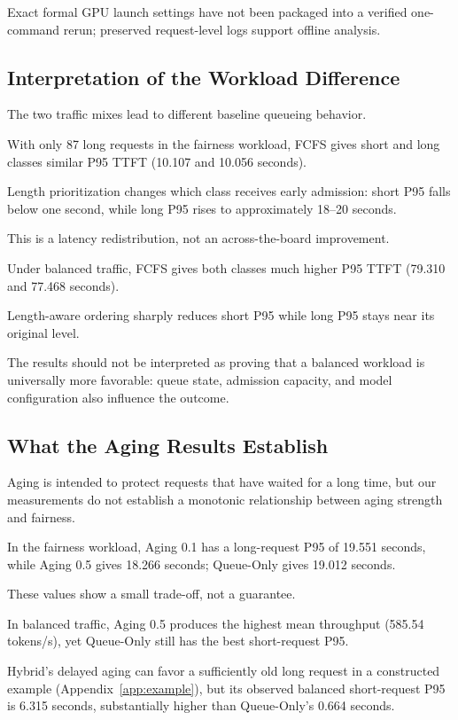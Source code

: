 \documentclass[sigplan,nonacm]{acmart}
\begin{document}
Exact formal GPU launch settings have not
been packaged into a verified one-command
rerun; preserved request-level logs
support offline analysis.

\subsection{Interpretation of the Workload Difference}

The two traffic mixes lead to different
baseline queueing behavior.

With only 87 long requests in the fairness
workload, FCFS gives short and long classes
similar P95 TTFT
(10.107 and 10.056 seconds).

Length prioritization changes which class
receives early admission: short P95 falls
below one second, while long P95 rises
to approximately 18--20 seconds.

This is a latency redistribution,
not an across-the-board improvement.

Under balanced traffic, FCFS gives both
classes much higher P95 TTFT
(79.310 and 77.468 seconds).

Length-aware ordering sharply reduces
short P95 while long P95 stays near
its original level.

The results should not be interpreted
as proving that a balanced workload
is universally more favorable:
queue state, admission capacity,
and model configuration also
influence the outcome.

\subsection{What the Aging Results Establish}

Aging is intended to protect requests
that have waited for a long time,
but our measurements do not establish
a monotonic relationship between
aging strength and fairness.

In the fairness workload, Aging 0.1
has a long-request P95 of 19.551 seconds,
while Aging 0.5 gives 18.266 seconds;
Queue-Only gives 19.012 seconds.

These values show a small trade-off,
not a guarantee.

In balanced traffic, Aging 0.5 produces
the highest mean throughput
(585.54 tokens/s), yet Queue-Only still
has the best short-request P95.

Hybrid's delayed aging can favor
a sufficiently old long request in
a constructed example
(Appendix~\ref{app:example}),
but its observed balanced short-request
P95 is 6.315 seconds, substantially
higher than Queue-Only's 0.664 seconds.
\end{document}
